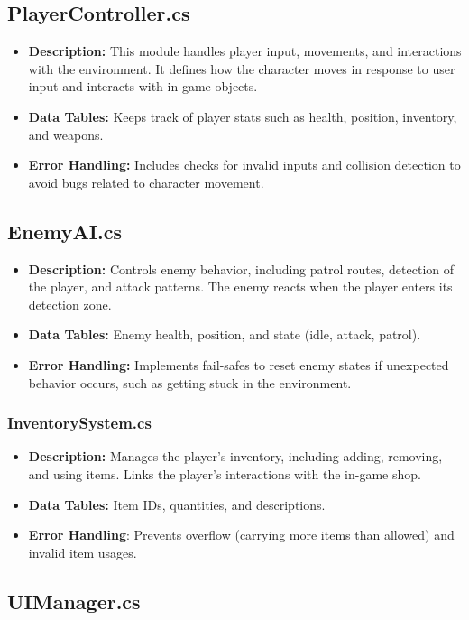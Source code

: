 \subsection{PlayerController.cs}
\begin{itemize}
	\item \textbf{Description:} This module handles player input, movements, and interactions with the environment. 
	It defines how the character moves in response to user input and interacts with in-game objects.
	
	\item \textbf{Data Tables:} Keeps track of player stats such as health, position, inventory, and weapons.
	\item \textbf{Error Handling:} Includes checks for invalid inputs and collision detection to avoid bugs related to character movement.
\end{itemize}
\subsection{EnemyAI.cs}
\begin{itemize}
	\item \textbf{Description:} Controls enemy behavior, including patrol routes, detection of the player, and attack patterns. The enemy reacts when the player enters its detection zone.
	\item \textbf{Data Tables:} Enemy health, position, and state (idle, attack, patrol).
	\item \textbf{Error Handling:} Implements fail-safes to reset enemy states if unexpected behavior occurs, such as getting stuck in the environment.
\end{itemize}
\subsubsection{InventorySystem.cs}
\begin{itemize}
	\item \textbf{Description:} Manages the player’s inventory, including adding, removing, and using items. Links the player's interactions with the in-game shop.
	\item \textbf{Data Tables:} Item IDs, quantities, and descriptions.
	\item \textbf{Error Handling}: Prevents overflow (carrying more items than allowed) and invalid item usages.
\end{itemize}
\subsection{UIManager.cs}

